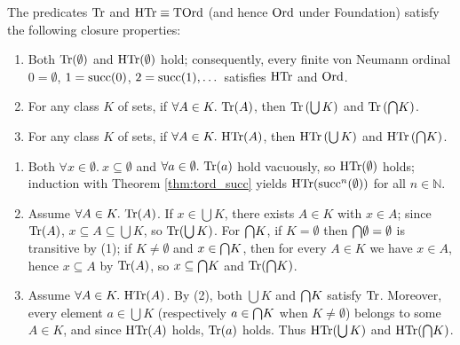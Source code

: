 \documentclass[10pt,a4paper]{article}
\begin{document}
\begin{theorem}\label{thm:tord_closure}
The predicates ${\textrm{Tr}}$ and ${\textrm{HTr}} \equiv {\textrm{TOrd}}$ (and hence ${\textrm{Ord}}$ under Foundation) satisfy the following closure properties:
\begin{enumerate}
\item Both ${\textrm{Tr}}(\emptyset)$ and ${\textrm{HTr}}(\emptyset)$ hold; consequently, every finite von Neumann ordinal $0 = \emptyset$, $1 = {\textrm{succ}}(0)$, $2 = {\textrm{succ}}(1), \dots$ satisfies ${\textrm{HTr}}$ and ${\textrm{Ord}}$.
\item For any class $K$ of sets, if $\forall A \in K.\ \Tr(A)$, then ${\textrm{Tr}}\left(\bigcup K\right)$ and ${\textrm{Tr}}\left({\bigcap} K\right)$.
\item For any class $K$ of sets, if $\forall A \in K.\ \HTr(A)$, then ${\textrm{HTr}}\left(\bigcup K\right)$ and ${\textrm{HTr}}\left({\bigcap} K\right)$.
\end{enumerate}
\end{theorem}
\myprf
\begin{enumerate}
\item Both $\forall x \in \emptyset.\ x \subseteq \emptyset$ and $\forall a \in \emptyset.\ {\textrm{Tr}}(a)$ hold vacuously, so ${\textrm{HTr}}(\emptyset)$ holds; induction with Theorem \ref{thm:tord_succ} yields ${\textrm{HTr}}({\textrm{succ}}^n(\emptyset))$ for all $n \in \mathbb{N}$.
\item Assume $\forall A \in K.\ \Tr(A)$. If $x \in \bigcup K$, there exists $A \in K$ with $x \in A$; since ${\textrm{Tr}}(A)$, $x \subseteq A \subseteq \bigcup K$, so ${\textrm{Tr}}(\bigcup K)$. For ${\bigcap} K$, if $K = \emptyset$ then ${\bigcap} \emptyset = \emptyset$ is transitive by (1); if $K \neq \emptyset$ and $x \in {\bigcap} K$, then for every $A \in K$ we have $x \in A$, hence $x \subseteq A$ by ${\textrm{Tr}}(A)$, so $x \subseteq {\bigcap} K$ and ${\textrm{Tr}}({\bigcap} K)$.
\item Assume $\forall A \in K.\ \HTr(A)$. By (2), both $\bigcup K$ and ${\bigcap} K$ satisfy ${\textrm{Tr}}$. Moreover, every element $a \in \bigcup K$ (respectively $a \in {\bigcap} K$ when $K \neq \emptyset$) belongs to some $A \in K$, and since ${\textrm{HTr}}(A)$ holds, ${\textrm{Tr}}(a)$ holds. Thus ${\textrm{HTr}}(\bigcup K)$ and ${\textrm{HTr}}({\bigcap} K)$.
\end{enumerate}
\myqed
\end{document}
